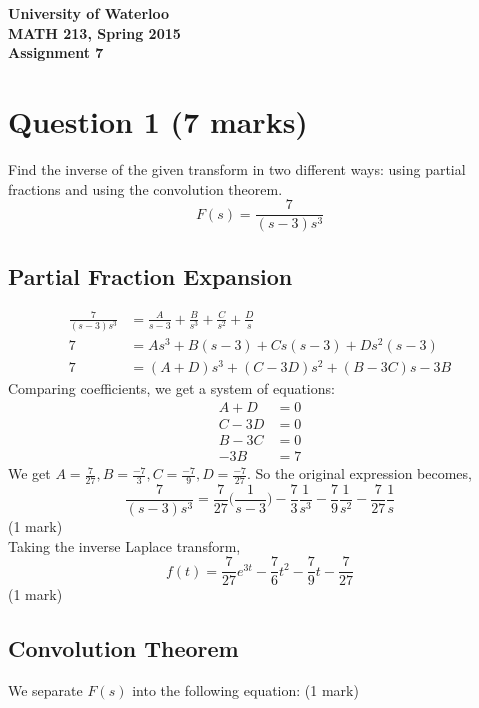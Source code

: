 \documentclass[12pt]{article}
\begin{document}
\begin{center}
{\Large\bf University of Waterloo}\\
\vspace{3mm}
{\Large\bf MATH 213, Spring 2015}\\
\vspace{2mm}
{\Large\bf Assignment 7}\\
\end{center}

\section*{Question 1 (7 marks)}
Find the inverse of the given transform in two different ways: using partial fractions and using the convolution theorem. $$F(s) = \frac{7}{(s-3)s^3}$$

\subsection*{Partial Fraction Expansion}
\begin{align*}
  \frac{7}{(s-3)s^3} &= \frac{A}{s-3} + \frac{B}{s^3} + \frac{C}{s^2} + \frac{D}{s} \\
  7 &= As^3 + B(s-3) + Cs(s-3) + Ds^2(s-3) \\
  7 &= (A+D)s^3 + (C-3D)s^2 + (B-3C)s - 3B \tag{1 mark}
\end{align*}
Comparing coefficients, we get a system of equations:
\begin{align*}
  A+D &= 0 \\
  C-3D &= 0 \\
  B-3C &= 0 \\
  -3B &= 7
\end{align*}
We get $A=\frac{7}{27},B=\frac{-7}{3},C=\frac{-7}{9},D=\frac{-7}{27}$. So the original expression becomes, $$\frac{7}{(s-3)s^3}=\frac{7}{27}\bigg(\frac{1}{s-3}\bigg) - \frac{7}{3}\frac{1}{s^3} - \frac{7}{9}\frac{1}{s^2} - \frac{7}{27}\frac{1}{s}$$ \hfill(1 mark) \\ Taking the inverse Laplace transform, $$f(t)=\frac{7}{27}e^{3t} - \frac{7}{6}t^2 - \frac{7}{9}t - \frac{7}{27}$$ \hfill (1 mark)

\subsection*{Convolution Theorem}

We separate $F(s)$ into the following equation: (1 mark)
\end{document}
